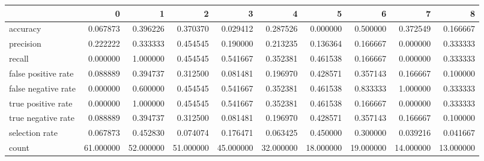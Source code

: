 \begin{tabular}{lrrrrrrrrr}
\toprule
{} &          0 &          1 &          2 &          3 &          4 &          5 &          6 &          7 &          8 \\
\midrule
accuracy            &   0.067873 &   0.396226 &   0.370370 &   0.029412 &   0.287526 &   0.000000 &   0.500000 &   0.372549 &   0.166667 \\
precision           &   0.222222 &   0.333333 &   0.454545 &   0.190000 &   0.213235 &   0.136364 &   0.166667 &   0.000000 &   0.333333 \\
recall              &   0.000000 &   1.000000 &   0.454545 &   0.541667 &   0.352381 &   0.461538 &   0.166667 &   0.000000 &   0.333333 \\
false positive rate &   0.088889 &   0.394737 &   0.312500 &   0.081481 &   0.196970 &   0.428571 &   0.357143 &   0.166667 &   0.100000 \\
false negative rate &   0.000000 &   0.600000 &   0.454545 &   0.541667 &   0.352381 &   0.461538 &   0.833333 &   1.000000 &   0.333333 \\
true positive rate  &   0.000000 &   1.000000 &   0.454545 &   0.541667 &   0.352381 &   0.461538 &   0.166667 &   0.000000 &   0.333333 \\
true negative rate  &   0.088889 &   0.394737 &   0.312500 &   0.081481 &   0.196970 &   0.428571 &   0.357143 &   0.166667 &   0.100000 \\
selection rate      &   0.067873 &   0.452830 &   0.074074 &   0.176471 &   0.063425 &   0.450000 &   0.300000 &   0.039216 &   0.041667 \\
count               &  61.000000 &  52.000000 &  51.000000 &  45.000000 &  32.000000 &  18.000000 &  19.000000 &  14.000000 &  13.000000 \\
\bottomrule
\end{tabular}
